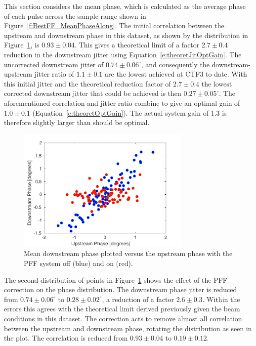 This section considers the mean phase, which is calculated as the average phase of each pulse across the sample range shown in Figure~\ref{f:BestFF_MeanPhaseAlong}. The initial correlation between the upstream and downstream phase in this dataset, as shown by the  distribution in Figure~\ref{f:BestFF_Real}, is \(0.93\pm0.04\). This gives a theoretical limit of a factor \(2.7\pm0.4\) reduction in the downstream jitter using Equation~\ref{e:theoretJitOptGain}. The uncorrected downstream jitter of \(0.74\pm0.06^\circ\), and consequently the downstream-upstream jitter ratio of \(1.1\pm0.1\) are the lowest achieved at CTF3 to date. With this initial jitter and the theoretical reduction factor of \(2.7\pm0.4\) the lowest corrected downstream jitter that could be achieved is then \(0.27\pm0.05^\circ\). The aforementioned correlation and jitter ratio combine to give an optimal gain of \(1.0\pm0.1\) (Equation~\ref{e:theoretOptGain}). The actual system gain of 1.3 is therefore slightly larger than should be optimal.

\begin{figure}
  \centering
  \includegraphics[width=0.75\textwidth]{Figures/feedforward/BestFF_Real}
  \caption{Mean downstream phase plotted versus the upstream phase with the PFF system off (blue) and on (red).}
  \label{f:BestFF_Real}
\end{figure}

The second distribution of points in Figure~\ref{f:BestFF_Real} shows the effect of the PFF correction on the phase distribution. The downstream phase jitter is reduced from \(0.74\pm0.06^\circ\) to \(0.28\pm0.02^\circ\), a reduction of a factor \(2.6\pm0.3\). Within the errors this agrees with the theoretical limit derived previously given the beam conditions in this dataset. The correction acts to remove almost all correlation between the upstream and downstream phase, rotating the distribution as seen in the plot. The correlation is reduced from \(0.93\pm0.04\) to \(0.19\pm0.12\).


